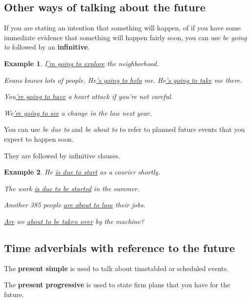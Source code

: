 \documentclass[oneside]{book}
\numberwithin{equation}{section}
\newtheorem{example}{Example}[section]
\begin{document}
\subsection{Other ways of talking about the future}
\noindent{} If you are stating an intention that something will happen, of if you have some immediate evidence that something will happen fairly soon, you can use \textit{be going to} followed by an \textbf{infinitive}.
\begin{example}
    I\underline{'m going to explore} the neighborhood.
    
    Evans knows lots of people. He\underline{'s going to help} me. He\underline{'s going to take} me there.
    
    You\underline{'re going to have} a heart attack if you're not careful.
    
    We\underline{'re going to see} a change in the law next year.
\end{example}
%
\noindent{} You can use \textit{be due to} and \textit{be about to} to refer to planned future events that you expect to happen soon.

They are followed by infinitive clauses.
\begin{example}
    He \underline{is due to start} as a courier shortly.
    
    The work \underline{is due to be started} in the summer.
    
    Another 385 people \underline{are about to lose} their jobs.
    
    \underline{Are} we \underline{about to be taken over} by the machine?
\end{example}

\subsection{Time adverbials with reference to the future}
\noindent{} The \textbf{present simple} is used to talk about timetabled or scheduled events.

The \textbf{present progressive} is used to state firm plans that you have for the future.
\end{document}
